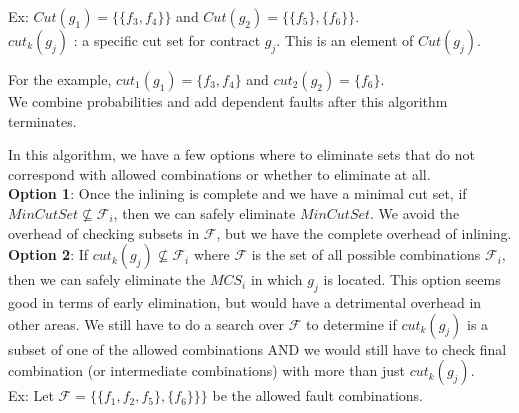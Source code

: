 Ex: $Cut(g_1) = \{\{f_3,f_4\}\}$ and $Cut(g_2) = \{\{f_5\}, \{f_6\}\}$.    \\

$cut_k(g_j)$ : a specific cut set for contract $g_j$. This is an element of $Cut(g_j)$. 

For the example, $cut_1(g_1) = \{f_3,f_4\}$ and $cut_2(g_2) = \{f_6\}$.\\


We combine probabilities and add dependent faults after this algorithm terminates. %


In this algorithm, we have a few options where to eliminate sets that do not correspond with allowed combinations or whether to eliminate at all. \\

\textbf{Option 1}: Once the inlining is complete and we have a minimal cut set, if $MinCutSet \not \subseteq \mathcal{F}_i $, then we can safely eliminate $MinCutSet$. We avoid the overhead of checking subsets in $\mathcal{F}$, but we have the complete overhead of inlining. \\

\textbf{Option 2}: If $cut_k(g_j) \not \subseteq \mathcal{F}_i$ where $\mathcal{F}$ is the set of all possible combinations $\mathcal{F}_i $, then we can safely eliminate the $MCS_i$ in which $g_j$ is located. This option seems good in terms of early elimination, but would have a detrimental overhead in other areas. We still have to do a search over $\mathcal{F}$  to determine if $cut_k(g_j)$ is a subset of one of the allowed combinations AND we would still have to check final combination (or intermediate combinations) with more than just $cut_k(g_j)$. \\

Ex: Let $\mathcal{F} = \{\{f_1,f_2,f_5\},\{f_6\}\}\}$ be the allowed fault combinations. 

